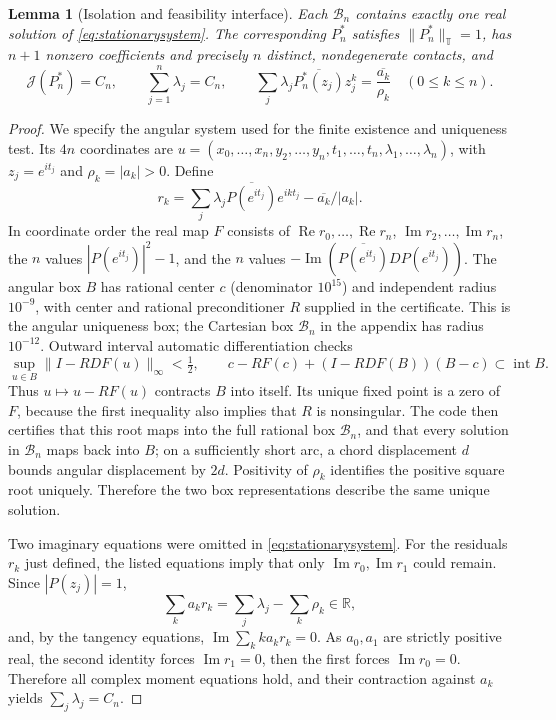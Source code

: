 \documentclass[11pt]{article}
\newtheorem{lemma}[theorem]{Lemma}
\newcommand{\T}{\mathbb T}
\newcommand{\R}{\mathbb R}
\newcommand{\J}{\mathcal J}
\DeclareMathOperator{\Rea}{Re}
\DeclareMathOperator{\Ima}{Im}
\begin{document}
\begin{lemma}[Isolation and feasibility interface]\label{lem:feasible67}
Each $\mathcal B_n$ contains exactly one real solution of \eqref{eq:stationarysystem}.  The corresponding $P_n^*$ satisfies $\|P_n^*\|_\T=1$, has $n+1$ nonzero coefficients and precisely $n$ distinct, nondegenerate contacts, and
\[
 \J(P_n^*)=C_n,\qquad
 \sum_{j=1}^n\lambda_j=C_n,\qquad
 \sum_j\lambda_j\overline{P_n^*(z_j)}z_j^k=\frac{\overline{a_k}}{\rho_k}
 \quad(0\le k\le n).
\]
\end{lemma}
\begin{proof}
We specify the angular system used for the finite existence and
uniqueness test. Its $4n$ coordinates are
$u=(x_0,\ldots,x_n,y_2,\ldots,y_n,t_1,\ldots,t_n,
\lambda_1,\ldots,\lambda_n)$, with $z_j=e^{it_j}$ and
$\rho_k=|a_k|>0$. Define
\[
 r_k=\sum_j\lambda_j\overline{P(e^{it_j})}e^{ikt_j}
          -\overline{a_k}/|a_k|.
\]
In coordinate order the real map $F$ consists of
$\Rea r_0,\ldots,\Rea r_n$, $\Ima r_2,\ldots,\Ima r_n$,
the $n$ values $|P(e^{it_j})|^2-1$, and the $n$ values
$-\Ima(\overline{P(e^{it_j})}DP(e^{it_j}))$.
The angular box $B$ has rational center $c$ (denominator $10^{15}$)
and independent radius $10^{-9}$, with center and rational
preconditioner $R$ supplied in the certificate. This is the angular
uniqueness box; the Cartesian box $\mathcal B_n$ in the appendix has
radius $10^{-12}$. Outward interval automatic differentiation checks
\begin{equation}\label{eq:contraction67}
 \sup_{u\in B}\|I-RDF(u)\|_\infty<\tfrac12,
 \qquad c-RF(c)+(I-RDF(B))(B-c)\subset\operatorname{int}B.
\end{equation}
Thus $u\mapsto u-RF(u)$ contracts $B$ into itself. Its unique fixed
point is a zero of $F$, because the first inequality also implies that
$R$ is nonsingular.  The code then certifies that this root maps into the full rational box $\mathcal B_n$, and that every solution in $\mathcal B_n$ maps back into $B$; on a sufficiently short arc, a chord displacement $d$ bounds angular displacement by $2d$.  Positivity of $\rho_k$ identifies the positive square root uniquely.  Therefore the two box representations describe the same unique solution.

Two imaginary equations were omitted in
\eqref{eq:stationarysystem}. For the residuals $r_k$ just defined,
the listed equations imply that only $\Ima r_0,\Ima r_1$ could remain.  Since $|P(z_j)|=1$,
\[
 \sum_ka_kr_k=\sum_j\lambda_j-\sum_k\rho_k\in\R,
\]
and, by the tangency equations, $\Ima\sum_kka_kr_k=0$.  As $a_0,a_1$ are strictly positive real, the second identity forces $\Ima r_1=0$, then the first forces $\Ima r_0=0$.  Therefore all complex moment equations hold, and their contraction against $a_k$ yields $\sum_j\lambda_j=C_n$.


\end{proof}
\end{document}
